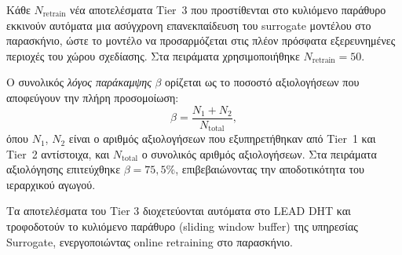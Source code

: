 Κάθε $N_{\text{retrain}}$ νέα αποτελέσματα Tier~3 που προστίθενται στο κυλιόμενο παράθυρο εκκινούν αυτόματα μια ασύγχρονη επανεκπαίδευση του surrogate μοντέλου στο παρασκήνιο, ώστε το μοντέλο να προσαρμόζεται στις πλέον πρόσφατα εξερευνημένες περιοχές του χώρου σχεδίασης. Στα πειράματα χρησιμοποιήθηκε $N_{\text{retrain}} = 50$.

Ο συνολικός \emph{λόγος παράκαμψης} $\beta$ ορίζεται ως το ποσοστό αξιολογήσεων που αποφεύγουν την πλήρη προσομοίωση:
\begin{equation}
\label{eq:bypass_ratio}
\beta = \frac{N_1 + N_2}{N_{\text{total}}},
\end{equation}
όπου $N_1$, $N_2$ είναι ο αριθμός αξιολογήσεων που εξυπηρετήθηκαν από Tier~1 και Tier~2 αντίστοιχα, και $N_{\text{total}}$ ο συνολικός αριθμός αξιολογήσεων. Στα πειράματα αξιολόγησης επιτεύχθηκε $\beta = 75{,}5\%$, επιβεβαιώνοντας την αποδοτικότητα του ιεραρχικού αγωγού.

Τα αποτελέσματα του Tier 3 διοχετεύονται αυτόματα στο LEAD DHT και τροφοδοτούν το κυλιόμενο παράθυρο (sliding window buffer) της υπηρεσίας Surrogate, ενεργοποιώντας online retraining στο παρασκήνιο.
